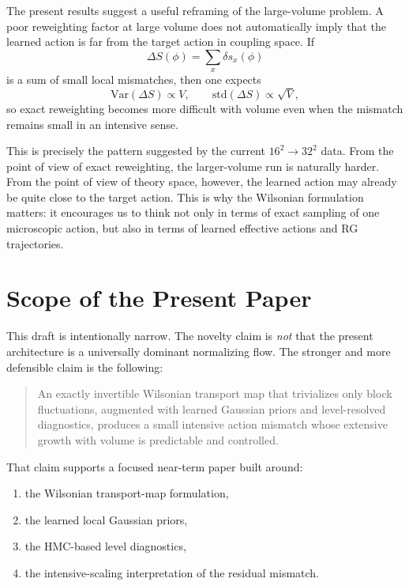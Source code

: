 \documentclass[aps,prd,preprint,nofootinbib,superscriptaddress,longbibliography]{revtex4-2}
\newcommand{\std}{\mathrm{std}}
\begin{document}
The present results suggest a useful reframing of the large-volume problem. A
poor reweighting factor at large volume does not automatically imply that the
learned action is far from the target action in coupling space. If
\begin{equation}
\Delta S(\phi)=\sum_x \delta s_x(\phi)
\end{equation}
is a sum of small local mismatches, then one expects
\begin{equation}
\mathrm{Var}(\Delta S)\propto V,
\qquad
\std(\Delta S)\propto \sqrt{V},
\end{equation}
so exact reweighting becomes more difficult with volume even when the mismatch
remains small in an intensive sense.

This is precisely the pattern suggested by the current $16^2\to32^2$ data. From
the point of view of exact reweighting, the larger-volume run is naturally
harder. From the point of view of theory space, however, the learned action may
already be quite close to the target action. This is why the Wilsonian
formulation matters: it encourages us to think not only in terms of exact
sampling of one microscopic action, but also in terms of learned effective
actions and RG trajectories.

\section{Scope of the Present Paper}
\label{sec:scope}

This draft is intentionally narrow. The novelty claim is \emph{not} that the
present architecture is a universally dominant normalizing flow. The stronger
and more defensible claim is the following:
\begin{quote}
An exactly invertible Wilsonian transport map that trivializes only block
fluctuations, augmented with learned Gaussian priors and level-resolved
diagnostics, produces a small intensive action mismatch whose extensive growth
with volume is predictable and controlled.
\end{quote}

That claim supports a focused near-term paper built around:
\begin{enumerate}
\item the Wilsonian transport-map formulation,
\item the learned local Gaussian priors,
\item the HMC-based level diagnostics,
\item the intensive-scaling interpretation of the residual mismatch.
\end{enumerate}
\end{document}
